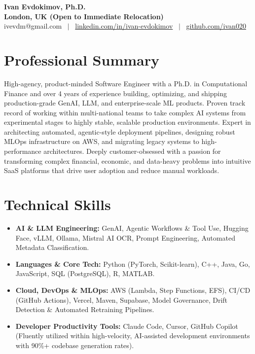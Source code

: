 \documentclass[11pt,a4paper]{article}
\begin{document}
\begin{center}
    {\Huge \bfseries Ivan Evdokimov, Ph.D.} \\ \vspace{4pt}
    \textbf{London, UK (Open to Immediate Relocation)} \\ \vspace{3pt}
    \small ivevdm@gmail.com \ $|$ \ \href{https://linkedin.com/in/ivan-evdokimov}{linkedin.com/in/ivan-evdokimov} \ $|$ \ \href{https://github.com/ivan020}{github.com/ivan020}
\end{center}

\section*{Professional Summary}
High-agency, product-minded Software Engineer with a Ph.D. in Computational Finance and over 4 years of experience building, optimizing, and shipping production-grade GenAI, LLM, and enterprise-scale ML products. Proven track record of working within multi-national teams to take complex AI systems from experimental stages to highly stable, scalable production environments. Expert in architecting automated, agentic-style deployment pipelines, designing robust MLOps infrastructure on AWS, and migrating legacy systems to high-performance architectures. Deeply customer-obsessed with a passion for transforming complex financial, economic, and data-heavy problems into intuitive SaaS platforms that drive user adoption and reduce manual workloads.

\section*{Technical Skills}
\begin{itemize}
    \item \textbf{AI \& LLM Engineering:} GenAI, Agentic Workflows \& Tool Use, Hugging Face, vLLM, Ollama, Mistral AI OCR, Prompt Engineering, Automated Metadata Classification.
    \item \textbf{Languages \& Core Tech:} Python (PyTorch, Scikit-learn), C++, Java, Go, JavaScript, SQL (PostgreSQL), R, MATLAB.
    \item \textbf{Cloud, DevOps \& MLOps:} AWS (Lambda, Step Functions, EFS), CI/CD (GitHub Actions), Vercel, Maven, Supabase, Model Governance, Drift Detection \& Automated Retraining Pipelines.
    \item \textbf{Developer Productivity Tools:} Claude Code, Cursor, GitHub Copilot (Fluently utilized within high-velocity, AI-assisted development environments with 90\%+ codebase generation rates).
\end{itemize}
\end{document}
